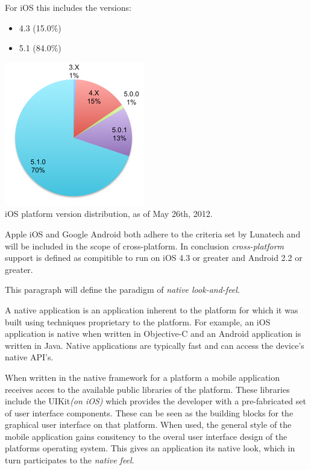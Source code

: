 \noindent For iOS this includes the versions:
\begin{itemize}
\item 4.3 (15.0\%)
\item 5.1 (84.0\%)
\end{itemize}
\begin{centering}
\includegraphics[scale=0.35]{images/iosversionchart.png}\\{iOS platform version distribution, as of May 26th, 2012.\cite{Sylvain2012}}\\
\end{centering}



Apple iOS and Google Android both adhere to the criteria set by Lunatech and will be included in the scope of cross-platform. In conclusion \emph{cross-platform} support is defined as compitible to run on iOS 4.3 or greater and Android 2.2 or greater.


This paragraph will define the paradigm of \emph{native look-and-feel}. 

A native application is an application inherent to the platform for which it was built using techniques proprietary to the platform. For example, an iOS application is native when written in Objective-C and an Android application is written in Java.  Native applications are typically fast and can access the device's native API's.

When written in the native framework for a platform a mobile application receives acces to the available public libraries of the platform. These libraries include the UIKit\emph{(on iOS)} which provides the developer with a pre-fabricated set of user interface components. These can be seen as the building blocks for the graphical user interface on that platform. When used, the general style of the mobile application gains consitency to the overal user interface design of the platforms operating system. This gives an application its native look, which in turn participates to the \emph{native feel}.

